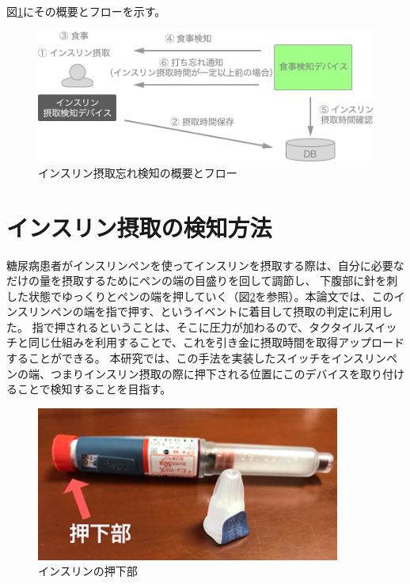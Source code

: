 図\ref{fig:insulin_design}にその概要とフローを示す。

\begin{figure}[htbp]
  \caption{インスリン摂取忘れ検知の概要とフロー}
  \label{fig:insulin_design}
  \begin{center}
    \includegraphics[bb=0 0 1000 530,width=15cm]{assets/insulin_design.png}
  \end{center}
\end{figure}

\section{インスリン摂取の検知方法}

糖尿病患者がインスリンペンを使ってインスリンを摂取する際は、自分に必要なだけの量を摂取するためにペンの端の目盛りを回して調節し、
下腹部に針を刺した状態でゆっくりとペンの端を押していく（図\ref{fig:insulin_pen_push}を参照）。本論文では、このインスリンペンの端を指で押す、というイベントに着目して摂取の判定に利用した。
指で押されるということは、そこに圧力が加わるので、タクタイルスイッチ\cite{tactile_switch}と同じ仕組みを利用することで、これを引き金に摂取時間を取得アップロードすることができる。
本研究では、この手法を実装したスイッチをインスリンペンの端、つまりインスリン摂取の際に押下される位置にこのデバイスを取り付けることで検知することを目指す。

\begin{figure}[htbp]
  \caption{インスリンの押下部}
  \label{fig:insulin_pen_push}
  \begin{center}
    \includegraphics[bb=0 0 1300 1000,width=10cm]{assets/insulin_pen_push.png}
  \end{center}
\end{figure}

